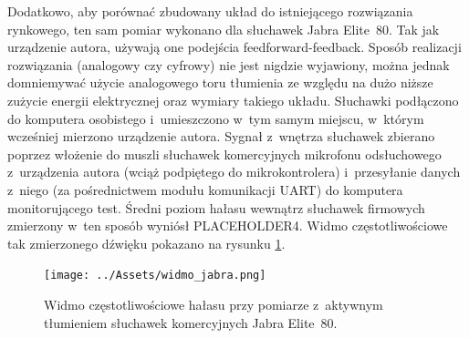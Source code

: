Dodatkowo, aby porównać zbudowany układ do istniejącego rozwiązania rynkowego, ten sam pomiar wykonano dla słuchawek Jabra Elite~80. Tak jak urządzenie autora, używają one podejścia feedforward-feedback.\cite{JabraEvolve80} Sposób realizacji rozwiązania (analogowy czy cyfrowy) nie jest nigdzie wyjawiony, można jednak domniemywać użycie analogowego toru tłumienia ze względu na dużo niższe zużycie energii elektrycznej oraz wymiary takiego układu. Słuchawki podłączono do komputera osobistego i~umieszczono w~tym samym miejscu, w~którym wcześniej mierzono urządzenie autora. Sygnał z~wnętrza słuchawek zbierano poprzez włożenie do muszli słuchawek komercyjnych mikrofonu odsłuchowego z~urządzenia autora (wciąż podpiętego do mikrokontrolera) i~przesyłanie danych z~niego (za pośrednictwem modułu komunikacji UART) do komputera monitorującego test. Średni poziom hałasu wewnątrz słuchawek firmowych zmierzony w~ten sposób wyniósł PLACEHOLDER4. Widmo częstotliwościowe tak zmierzonego dźwięku pokazano na rysunku \ref{fig:widmo_jabra}.
\begin{figure}[h!]
	\centering
	\texttt{[image: ../Assets/widmo\_jabra.png]}	
	\caption{Widmo częstotliwościowe hałasu przy pomiarze z~aktywnym tłumieniem słuchawek komercyjnych Jabra Elite~80.}
	\label{fig:widmo_jabra}
\end{figure}
